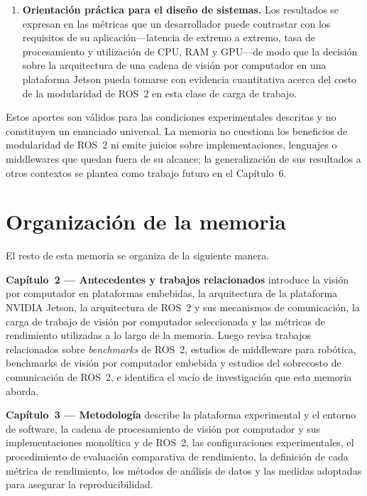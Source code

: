 \begin{enumerate}[leftmargin=*]
  \item \textbf{Orientación práctica para el diseño de sistemas.} Los
        resultados se expresan en las métricas que un desarrollador puede
        contrastar con los requisitos de su aplicación---latencia de extremo a
        extremo, tasa de procesamiento y utilización de CPU, RAM y GPU---de
        modo que la decisión sobre la arquitectura de una cadena de visión por
        computador en una plataforma Jetson pueda tomarse con evidencia
        cuantitativa acerca del costo de la modularidad de ROS~2 en esta clase
        de carga de trabajo.
\end{enumerate}

Estos aportes son válidos para las condiciones experimentales descritas y no
constituyen un enunciado universal. La memoria no cuestiona los beneficios de
modularidad de ROS~2 ni emite juicios sobre implementaciones, lenguajes o
middlewares que quedan fuera de su alcance; la generalización de sus
resultados a otros contextos se plantea como trabajo futuro en el Capítulo~6.

\section{Organización de la memoria}
\label{sec:organization}

El resto de esta memoria se organiza de la siguiente manera.

\textbf{Capítulo~2 --- Antecedentes y trabajos relacionados} introduce la
visión por computador en plataformas embebidas, la arquitectura de la
plataforma NVIDIA Jetson, la arquitectura de ROS~2 y sus mecanismos de
comunicación, la carga de trabajo de visión por computador seleccionada y
las métricas de rendimiento utilizadas a lo largo de la memoria. Luego revisa
trabajos relacionados sobre \emph{benchmarks} de ROS~2, estudios de
middleware para robótica, benchmarks de visión por computador embebida y
estudios del sobrecosto de comunicación de ROS~2, e identifica el vacío de
investigación que esta memoria aborda.

\textbf{Capítulo~3 --- Metodología} describe la plataforma experimental y el
entorno de software, la cadena de procesamiento de visión por computador y
sus implementaciones monolítica y de ROS~2, las configuraciones
experimentales, el procedimiento de evaluación comparativa de rendimiento,
la definición de cada métrica de rendimiento, los métodos de análisis de
datos y las medidas adoptadas para asegurar la reproducibilidad.

